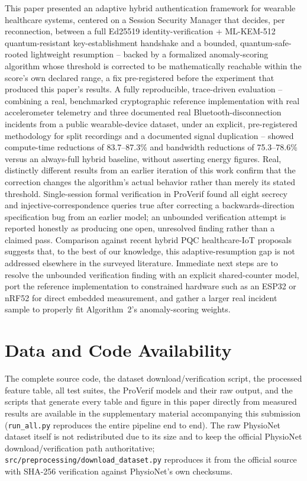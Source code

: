 \documentclass[conference]{IEEEtran}
\begin{document}
This paper presented an adaptive hybrid authentication framework for
wearable healthcare systems, centered on a Session Security Manager that
decides, per reconnection, between a full Ed25519 identity-verification +
ML-KEM-512 quantum-resistant key-establishment handshake and a bounded,
quantum-safe-rooted lightweight resumption -- backed by a formalized
anomaly-scoring algorithm whose threshold is corrected to be mathematically
reachable within the score's own declared range, a fix pre-registered
before the experiment that produced this paper's results. A fully
reproducible, trace-driven evaluation -- combining a real, benchmarked
cryptographic reference implementation with real accelerometer telemetry
and three documented real Bluetooth-disconnection incidents from a public
wearable-device dataset, under an explicit, pre-registered methodology for
split recordings and a documented signal duplication -- showed compute-time
reductions of 83.7--87.3\% and bandwidth reductions of 75.3--78.6\% versus
an always-full hybrid baseline, without asserting energy figures. Real,
distinctly different results from an earlier iteration of this work confirm
that the correction changes the algorithm's actual behavior rather than
merely its stated threshold. Single-session formal verification in
ProVerif found all eight secrecy and injective-correspondence queries true
after correcting a backwards-direction specification bug from an earlier
model; an unbounded verification attempt is reported honestly as producing
one open, unresolved finding rather than a claimed pass. Comparison against
recent hybrid PQC healthcare-IoT proposals suggests that, to the best of our
knowledge, this adaptive-resumption gap is not addressed elsewhere in the
surveyed literature. Immediate next steps are to resolve the unbounded
verification finding with an explicit shared-counter model, port the
reference implementation to constrained hardware such as an ESP32 or nRF52
for direct embedded measurement, and gather a larger real incident sample
to properly fit Algorithm~2's anomaly-scoring weights.

\section*{Data and Code Availability}

The complete source code, the dataset download/verification script, the
processed feature table, all test suites, the ProVerif models and their raw
output, and the scripts that generate every table and figure in this paper
directly from measured results are available in the supplementary material
accompanying this submission (\texttt{run\_all.py} reproduces the entire
pipeline end to end). The raw PhysioNet dataset itself is not redistributed
due to its size and to keep the official PhysioNet download/verification
path authoritative; \texttt{src/preprocessing/download\_dataset.py}
reproduces it from the official source with SHA-256 verification against
PhysioNet's own checksums.
\end{document}
